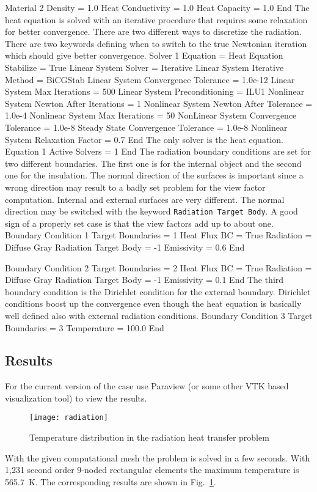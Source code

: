 Material 2
   Density = 1.0
   Heat Conductivity = 1.0
   Heat Capacity = 1.0
End
\ttend
The heat equation is solved with an iterative procedure that requires some relaxation 
for better convergence. There are two different ways to discretize the radiation. 
There are two keywords defining when to switch to the true Newtonian iteration
which should give better convergence.
\ttbegin
Solver 1
  Equation = Heat Equation
  Stabilize = True
  Linear System Solver = Iterative
  Linear System Iterative Method = BiCGStab
  Linear System Convergence Tolerance = 1.0e-12
  Linear System Max Iterations = 500
  Linear System Preconditioning = ILU1
  Nonlinear System Newton After Iterations = 1
  Nonlinear System Newton After Tolerance = 1.0e-4
  Nonlinear System Max Iterations = 50
  NonLinear System Convergence Tolerance = 1.0e-8
  Steady State Convergence Tolerance = 1.0e-8
  Nonlinear System Relaxation Factor = 0.7
End
\ttend
The only solver is the heat equation.
\ttbegin
Equation 1
  Active Solvers = 1
End
\ttend
%
The radiation boundary conditions are set for two different boundaries. The first one
is for the internal object and the second one for the insulation. The normal direction
of the surfaces is important since a wrong direction may result to a badly set problem for
the view factor computation. Internal and external surfaces are very different.
The normal direction may be switched with the keyword \texttt{Radiation Target Body}.
A good sign of a properly set case is that the view factors add up to about one.
\ttbegin
Boundary Condition 1
   Target Boundaries = 1
   Heat Flux BC = True
   Radiation = Diffuse Gray
   Radiation Target Body = -1
   Emissivity = 0.6
End

Boundary Condition 2
   Target Boundaries = 2
   Heat Flux BC = True
   Radiation = Diffuse Gray
   Radiation Target Body = -1
   Emissivity = 0.1
End
\ttend
%
The third boundary condition is the Dirichlet condition for the external boundary.
Dirichlet conditions boost up the convergence even though the heat equation is basically
well defined also with external radiation conditions.
\ttbegin
Boundary Condition 3
   Target Boundaries = 3
   Temperature = 100.0
End
\ttend


\subsection*{Results}

For the current version of the case use Paraview (or some other
VTK based visualization tool) to view the results. 

\begin{figure}
\begin{center}
  \texttt{[image: radiation]}
\end{center}
\caption{Temperature distribution in the radiation heat transfer
problem}
\label{fig:temp_rad1}
\end{figure}
 
With the given computational mesh the problem is solved in 
a few seconds. With 1,231 second order 9-noded
rectangular elements the maximum temperature is 565.7~K.
The corresponding results are shown
in Fig.~\ref{fig:temp_rad1}.

\hfill
